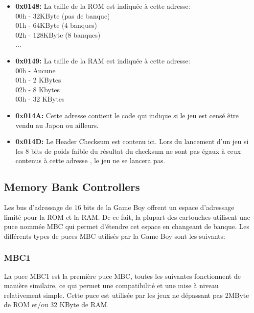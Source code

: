\documentclass[french]{report}
\begin{document}
\begin{itemize}
\item \textbf{0x0148:} La taille de la ROM est indiquée à cette adresse:
\\00h -  32KByte (pas de banque)
\\01h -  64KByte (4 banques)
\\02h - 128KByte (8 banques)
\\...

\item \textbf{0x0149:} La taille de la RAM est indiquée à cette adresse:
\\00h - Aucune
\\01h - 2 KBytes
\\02h - 8 Kbytes
\\03h - 32 KBytes\\

\item \textbf{0x014A:} Cette adresse contient le code qui indique si le jeu est censé être vendu au Japon ou ailleurs.\\

\item \textbf{0x014D:} Le Header Checksum est contenu ici. Lors du lancement d'un jeu si les 8 bits de poids faible du résultat du checksum ne sont pas égaux à ceux contenus à cette adresse , le jeu ne se lancera pas.\\

\end{itemize}

\subsection{Memory Bank Controllers}
Les bus d'adressage de 16 bits de la Game Boy offrent un espace d'adressage limité pour la ROM et la RAM. De ce fait, la plupart des cartouches utilisent une puce nommée MBC qui permet d'étendre cet espace en changeant de banque. Les différents types de puces MBC utilisés par la Game Boy sont les suivants:\\

\subsubsection{MBC1}
	La puce MBC1 est la première puce MBC, toutes les suivantes fonctionnent de manière similaire, ce qui permet une compatibilité et une mise à niveau relativement simple. Cette puce est utilisée par les jeux ne dépassant pas 2MByte de ROM et/ou 32 KByte de RAM.
\end{document}
